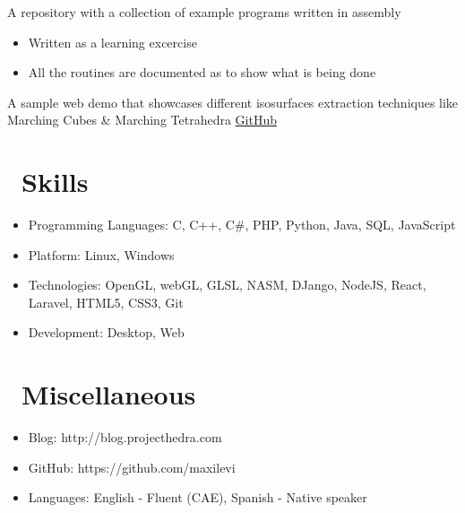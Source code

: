 \documentclass{resume}
\begin{document}
A repository with a collection of example programs written in assembly
\begin{itemize}
  \item Written as a learning excercise
  \item All the routines are documented as to show what is being done
\end{itemize}


A sample web demo that showcases different isosurfaces extraction techniques like Marching Cubes \& Marching Tetrahedra
\href {https://github.com/maxilevi/isosurface}{GitHub}


\section{\faCogs\ Skills}
\begin{itemize}[parsep=0.5ex]
  \item Programming Languages: C, C++, C\#, PHP, Python, Java, SQL, JavaScript
  \item Platform: Linux, Windows
  \item Technologies: OpenGL, webGL, GLSL, NASM, DJango, NodeJS, React, Laravel, HTML5, CSS3, Git
  \item Development: Desktop, Web
\end{itemize}


\section{\faInfo\ Miscellaneous}
\begin{itemize}[parsep=0.5ex]
  \item Blog: http://blog.projecthedra.com
  \item GitHub: https://github.com/maxilevi
  \item Languages: English - Fluent (CAE), Spanish - Native speaker
\end{itemize}
\end{document}
